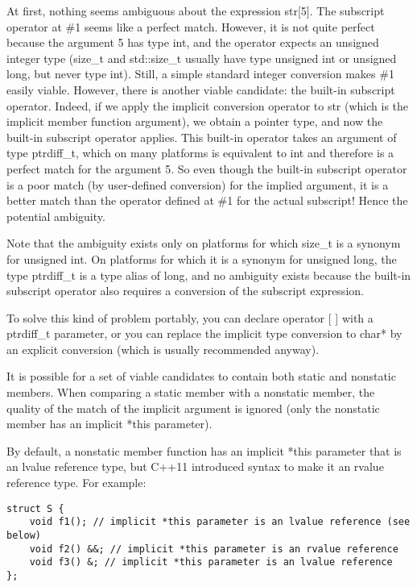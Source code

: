 At first, nothing seems ambiguous about the expression str[5]. The subscript operator at \#1 seems like a perfect match. However, it is not quite perfect because the argument 5 has type int, and the operator expects an unsigned integer type (size\_t and std::size\_t usually have type unsigned int or unsigned long, but never type int). Still, a simple standard integer conversion makes \#1 easily viable. However, there is another viable candidate: the built-in subscript operator. Indeed, if we apply the implicit conversion operator to str (which is the implicit member function argument), we obtain a pointer type, and now the built-in subscript operator applies. This built-in operator takes an argument of type ptrdiff\_t, which on many platforms is equivalent to int and therefore is a perfect match for the argument 5. So even though the built-in subscript operator is a poor match (by user-defined conversion) for the implied argument, it is a better match than the operator defined at \#1 for the actual subscript! Hence the potential ambiguity.

\begin{tcolorbox}[colback=webgreen!5!white,colframe=webgreen!75!black]
\hspace*{0.75cm}Note that the ambiguity exists only on platforms for which size\_t is a synonym for unsigned int. On platforms for which it is a synonym for unsigned long, the type ptrdiff\_t is a type alias of long, and no ambiguity exists because the built-in subscript operator also requires a conversion of the subscript expression.
\end{tcolorbox}

To solve this kind of problem portably, you can declare operator [ ] with a ptrdiff\_t parameter, or you can replace the implicit type conversion to char* by an explicit conversion (which is usually recommended anyway).

It is possible for a set of viable candidates to contain both static and nonstatic members. When comparing a static member with a nonstatic member, the quality of the match of the implicit argument is ignored (only the nonstatic member has an implicit *this parameter).

By default, a nonstatic member function has an implicit *this parameter that is an lvalue reference type, but C++11 introduced syntax to make it an rvalue reference type. For example:

\begin{lstlisting}[style=styleCXX]
struct S {
	void f1(); // implicit *this parameter is an lvalue reference (see below)
	void f2() &&; // implicit *this parameter is an rvalue reference
	void f3() &; // implicit *this parameter is an lvalue reference
};
\end{lstlisting}

